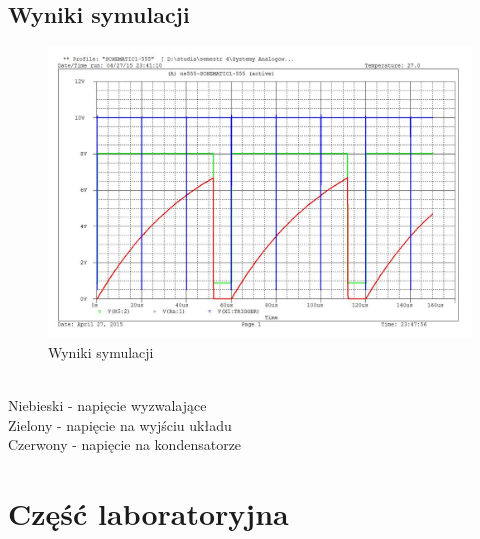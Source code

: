 \documentclass[a4paper,12pt]{article}
\begin{document}
\subsection {Wyniki symulacji}   
\begin{figure}[h]
  \center 
  \includegraphics[width=1.2\textwidth]{sim}
  \caption{Wyniki symulacji}
\end{figure}
\\
Niebieski - napięcie wyzwalające  \\
Zielony   - napięcie na wyjściu układu     \\
Czerwony  - napięcie na kondensatorze      \\
\pagebreak
\section{Część laboratoryjna}
\end{document}
